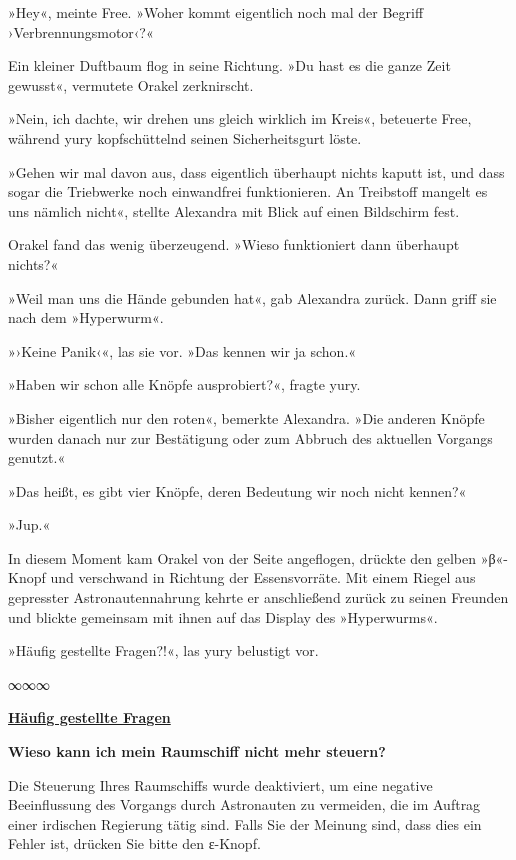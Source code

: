 »Hey«, meinte Free. »Woher kommt eigentlich noch mal der Begriff ›Verbrennungsmotor‹?«

Ein kleiner Duftbaum flog in seine Richtung. »Du hast es die ganze Zeit gewusst«, vermutete Orakel zerknirscht.

»Nein, ich dachte, wir drehen uns gleich wirklich im Kreis«, beteuerte Free, während yury kopfschüttelnd seinen Sicherheitsgurt löste.

»Gehen wir mal davon aus, dass eigentlich überhaupt nichts kaputt ist, und dass sogar die Triebwerke noch einwandfrei funktionieren. An Treibstoff mangelt es uns nämlich nicht«, stellte Alexandra mit Blick auf einen Bildschirm fest.

Orakel fand das wenig überzeugend. »Wieso funktioniert dann überhaupt nichts?«

»Weil man uns die Hände gebunden hat«, gab Alexandra zurück. Dann griff sie nach dem »Hyperwurm«.

»›Keine Panik‹«, las sie vor. »Das kennen wir ja schon.«

»Haben wir schon alle Knöpfe ausprobiert?«, fragte yury.

»Bisher eigentlich nur den roten«, bemerkte Alexandra. »Die anderen Knöpfe wurden danach nur zur Bestätigung oder zum Abbruch des aktuellen Vorgangs genutzt.«

»Das heißt, es gibt vier Knöpfe, deren Bedeutung wir noch nicht kennen?«

»Jup.«

In diesem Moment kam Orakel von der Seite angeflogen, drückte den gelben »β«-Knopf und verschwand in Richtung der Essensvorräte. Mit einem Riegel aus gepresster Astronautennahrung kehrte er anschließend zurück zu seinen Freunden und blickte gemeinsam mit ihnen auf das Display des »Hyperwurms«.

»Häufig gestellte Fragen?!«, las yury belustigt vor.

\begin{center}
	∞∞∞
\end{center}

    \begin{itshape}

\underline{\textbf{Häufig gestellte Fragen}}

\textbf{Wieso kann ich mein Raumschiff nicht mehr steuern?}

Die Steuerung Ihres Raumschiffs wurde deaktiviert, um eine negative Beeinflussung des Vorgangs durch Astronauten zu vermeiden, die im Auftrag einer irdischen Regierung tätig sind. Falls Sie der Meinung sind, dass dies ein Fehler ist, drücken Sie bitte den ε-Knopf.

    \end{itshape}

